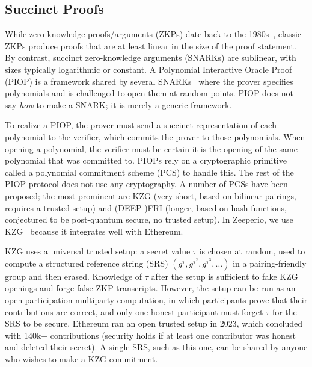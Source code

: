 
\subsection{Succinct Proofs}

While zero-knowledge proofs/arguments (ZKPs) date back to the 1980s~\cite{GMW86,BCC88}, classic ZKPs produce proofs that are at least linear in the size of the proof statement. 
By contrast, succinct zero-knowledge arguments (SNARKs) are sublinear, with sizes typically logarithmic or constant. 
A Polynomial Interactive Oracle Proof (PIOP) is a framework shared by several SNARKs~\cite{MBKM19,CHM+20,BFS20} where the prover specifies polynomials and is challenged to open them at random points. 
PIOP does not say \textit{how} to make a SNARK; it is merely a generic framework. 

To realize a PIOP, the prover must send a succinct representation of each polynomial to the verifier, which commits the prover to those polynomials. 
When opening a polynomial, the verifier must be certain it is the opening of the same polynomial that was committed to. 
PIOPs rely on a cryptographic primitive called a polynomial commitment scheme (PCS) to handle this. 
The rest of the PIOP protocol does not use any cryptography. 
A number of PCSs have been proposed; the most prominent are KZG (very short, based on bilinear pairings, requires a trusted setup) and (DEEP-)FRI (longer, based on hash functions, conjectured to be post-quantum secure, no trusted setup). 
In Zeeperio, we use KZG~\cite{KZG10} because it integrates well with Ethereum.

KZG uses a universal trusted setup: a secret value $\tau$ is chosen at random, used to compute a structured reference string (SRS) $(g^\tau, g^{\tau^2},g^{\tau^3},\ldots)$ in a pairing-friendly group and then erased. 
Knowledge of $\tau$ after the setup is sufficient to fake KZG openings and forge false ZKP transcripts. 
However, the setup can be run as an open participation multiparty computation, in which participants prove that their contributions are correct, and only one honest participant must forget $\tau$ for the SRS to be secure. 
Ethereum ran an open trusted setup in 2023, which concluded with 140k+ contributions (security holds if at least one contributor was honest and deleted their secret). 
A single SRS, such as this one, can be shared by anyone who wishes to make a KZG commitment.

